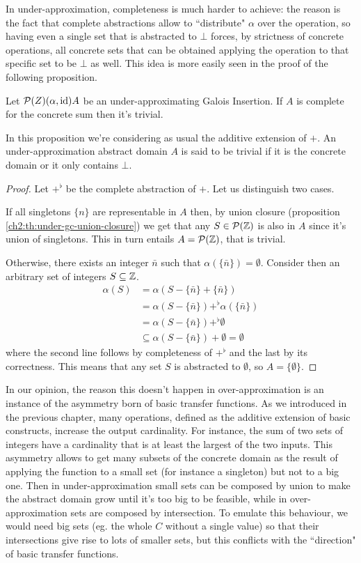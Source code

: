 In under-approximation, completeness is much harder to achieve: the reason is the fact that complete abstractions allow to ``distribute" $\alpha$ over the operation, so having even a single set that is abstracted to $\bot$ forces, by strictness of concrete operations, all concrete sets that can be obtained applying the operation to that specific set to be $\bot$ as well. This idea is more easily seen in the proof of the following proposition.
\begin{prop}\label{ch3:th:sum-complete-trivial}
	Let $\mathcal{P}(Z) (\alpha, \text{id}) A$ be an under-approximating Galois Insertion. If $A$ is complete for the concrete sum then it's trivial.
\end{prop}
In this proposition we're considering as usual the additive extension of $+$. An under-approximation abstract domain $A$ is said to be trivial if it is the concrete domain or it only contains $\bot$.
\begin{proof}
	Let $+^{\flat}$ be the complete abstraction of $+$.
	Let us distinguish two cases.

	If all singletons $\{ n \}$ are representable in $A$ then, by union closure (proposition \ref{ch2:th:under-gc-union-closure}) we get that any $S \in \mathcal{P}(\mathbb{Z})$ is also in $A$ since it's union of singletons. This in turn entails $A = \mathcal{P}(\mathbb{Z})$, that is trivial.

	Otherwise, there exists an integer $\bar{n}$ such that $\alpha(\{ \bar{n} \}) = \emptyset$. Consider then an arbitrary set of integers $S \subseteq \mathbb{Z}$.
	\begin{align*}
		\alpha(S) &= \alpha(S - \{ \bar{n} \} + \{ \bar{n} \} ) \\
		&= \alpha(S - \{ \bar{n} \}) +^{\flat} \alpha(\{ \bar{n} \}) \\
		&= \alpha(S - \{ \bar{n} \}) +^{\flat} \emptyset \\
		&\subseteq \alpha(S - \{ \bar{n} \}) + \emptyset = \emptyset
	\end{align*}
	where the second line follows by completeness of $+^{\flat}$ and the last by its correctness. This means that any set $S$ is abstracted to $\emptyset$, so $A = \{ \emptyset \}$.
\end{proof}

In our opinion, the reason this doesn't happen in over-approximation is an instance of the asymmetry born of basic transfer functions. As we introduced in the previous chapter, many operations, defined as the additive extension of basic constructs, increase the output cardinality. For instance, the sum of two sets of integers have a cardinality that is at least the largest of the two inputs. This asymmetry allows to get many subsets of the concrete domain as the result of applying the function to a small set (for instance a singleton) but not to a big one.
Then in under-approximation small sets can be composed by union to make the abstract domain grow until it's too big to be feasible, while in over-approximation sets are composed by intersection. To emulate this behaviour, we would need big sets (eg. the whole $C$ without a single value) so that their intersections give rise to lots of smaller sets, but this conflicts with the ``direction" of basic transfer functions.

